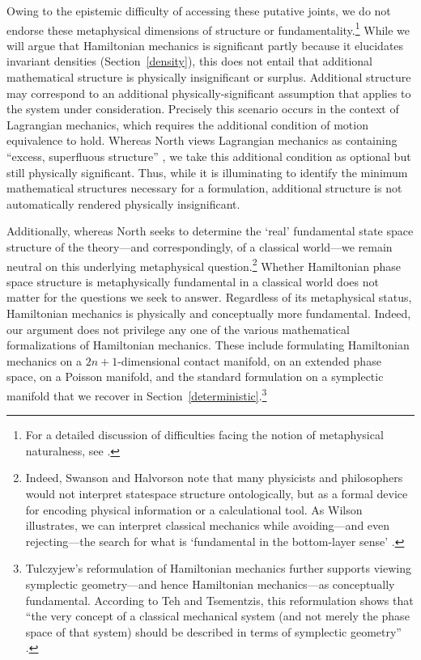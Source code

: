 \documentclass[12pt, english, twoside]{article} %
\begin{document}
Owing to the epistemic difficulty of accessing these putative joints, we do not endorse these metaphysical dimensions of structure or fundamentality.\footnote{For a detailed discussion of difficulties facing the notion of metaphysical naturalness, see \textcites[]{Dorr_Hawthorne}.} While we will argue that Hamiltonian mechanics is significant partly because it elucidates invariant densities (Section~\ref{density}), this does not entail that additional mathematical structure is physically insignificant or surplus. Additional structure may correspond to an additional physically-significant assumption that applies to the system under consideration. Precisely this scenario occurs in the context of Lagrangian mechanics, which requires the additional condition of motion equivalence to hold. Whereas North views Lagrangian mechanics as containing ``excess, superfluous structure'' \parencites*[75]{North}, we take this additional condition as optional but still physically significant. Thus, while it is illuminating to identify the minimum mathematical structures necessary for a formulation, additional structure is not automatically rendered physically insignificant. 

Additionally, whereas North \parencites*[76]{North} seeks to determine the `real' fundamental state space structure of the theory---and correspondingly, of a classical world---we remain neutral on this underlying metaphysical question.\footnote{Indeed, Swanson and Halvorson \parencites*[]{Swanson} note that many physicists and philosophers would not interpret statespace structure ontologically, but as a formal device for encoding physical information or a calculational tool. As Wilson illustrates, we can interpret classical mechanics while avoiding---and even rejecting---the search for what is `fundamental in the bottom-layer sense' \parencites*[53]{Wilson}.} Whether Hamiltonian phase space structure is metaphysically fundamental in a classical world does not matter for the questions we seek to answer. Regardless of its metaphysical status, Hamiltonian mechanics is physically and conceptually more fundamental. Indeed, our argument does not privilege any one of the various mathematical formalizations of Hamiltonian mechanics. These include formulating Hamiltonian mechanics on a $2n+1$-dimensional contact manifold, on an extended phase space, on a Poisson manifold, and the standard formulation on a symplectic manifold that we recover in Section~\ref{deterministic}.\footnote{Tulczyjew's reformulation of Hamiltonian mechanics further supports viewing symplectic geometry---and hence Hamiltonian mechanics---as conceptually fundamental. According to Teh and Tsementzis, this reformulation shows that  ``the very concept of a classical mechanical system (and not merely the phase space of that system) should be described in terms of symplectic geometry'' \parencites*[46]{Teh}.}
\end{document}
